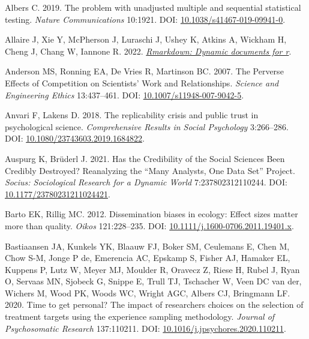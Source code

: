 \documentclass[10pt,a4paper]{article}
\newlength{\cslhangindent}
\newlength{\cslentryspacingunit} %
\newenvironment{CSLReferences}[2] %
 {%
  \setlength{\parindent}{0pt}
  \ifodd #1
  \let\oldpar\par
  \def\par{\hangindent=\cslhangindent\oldpar}
  \fi
  \setlength{\parskip}{#2\cslentryspacingunit}
 }%
 {}
\begin{document}
\hypertarget{refs}{}
\begin{CSLReferences}{1}{0}
\leavevmode{}%
Albers C. 2019. The problem with unadjusted multiple and sequential statistical testing. \emph{Nature Communications} 10:1921. DOI: \href{https://doi.org/10.1038/s41467-019-09941-0}{10.1038/s41467-019-09941-0}.

\leavevmode{}%
Allaire J, Xie Y, McPherson J, Luraschi J, Ushey K, Atkins A, Wickham H, Cheng J, Chang W, Iannone R. 2022. \emph{\href{https://github.com/rstudio/rmarkdown}{Rmarkdown: Dynamic documents for r}}.

\leavevmode{}%
Anderson MS, Ronning EA, De Vries R, Martinson BC. 2007. The {Perverse} {Effects} of {Competition} on {Scientists}' {Work} and {Relationships}. \emph{Science and Engineering Ethics} 13:437--461. DOI: \href{https://doi.org/10.1007/s11948-007-9042-5}{10.1007/s11948-007-9042-5}.

\leavevmode{}%
Anvari F, Lakens D. 2018. The replicability crisis and public trust in psychological science. \emph{Comprehensive Results in Social Psychology} 3:266--286. DOI: \href{https://doi.org/10.1080/23743603.2019.1684822}{10.1080/23743603.2019.1684822}.

\leavevmode{}%
Auspurg K, Brüderl J. 2021. Has the {Credibility} of the {Social} {Sciences} {Been} {Credibly} {Destroyed}? {Reanalyzing} the {``{Many} {Analysts}, {One} {Data} {Set}''} {Project}. \emph{Socius: Sociological Research for a Dynamic World} 7:237802312110244. DOI: \href{https://doi.org/10.1177/23780231211024421}{10.1177/23780231211024421}.

\leavevmode{}%
Barto EK, Rillig MC. 2012. Dissemination biases in ecology: Effect sizes matter more than quality. \emph{Oikos} 121:228--235. DOI: \href{https://doi.org/10.1111/j.1600-0706.2011.19401.x}{10.1111/j.1600-0706.2011.19401.x}.

\leavevmode{}%
Bastiaansen JA, Kunkels YK, Blaauw FJ, Boker SM, Ceulemans E, Chen M, Chow S-M, Jonge P de, Emerencia AC, Epskamp S, Fisher AJ, Hamaker EL, Kuppens P, Lutz W, Meyer MJ, Moulder R, Oravecz Z, Riese H, Rubel J, Ryan O, Servaas MN, Sjobeck G, Snippe E, Trull TJ, Tschacher W, Veen DC van der, Wichers M, Wood PK, Woods WC, Wright AGC, Albers CJ, Bringmann LF. 2020. Time to get personal? {The} impact of researchers choices on the selection of treatment targets using the experience sampling methodology. \emph{Journal of Psychosomatic Research} 137:110211. DOI: \href{https://doi.org/10.1016/j.jpsychores.2020.110211}{10.1016/j.jpsychores.2020.110211}.


\end{CSLReferences}
\end{document}
